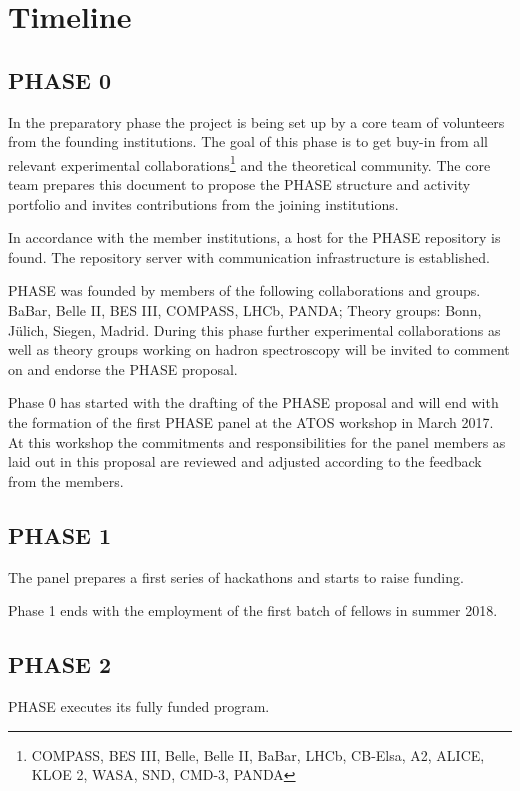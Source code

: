 \section{Timeline}

\subsection{PHASE 0}
In the preparatory phase the project is being set up by a core team of volunteers from the founding institutions. The goal of this phase is to get buy-in from all relevant
experimental collaborations\footnote{COMPASS, BES III, Belle, Belle II, BaBar, LHCb, CB-Elsa, A2, ALICE, KLOE 2, WASA, SND, CMD-3, PANDA} and the theoretical community.  The core team prepares this document to propose the PHASE structure and activity portfolio and invites contributions from the joining institutions.

In accordance with the member institutions, a host for the PHASE repository is found. The repository server with communication infrastructure is established.

PHASE was founded by members of the following collaborations and groups. BaBar, Belle II, BES III, COMPASS, LHCb, PANDA; Theory groups: Bonn, J\"ulich, Siegen, Madrid.
During this phase further experimental collaborations as well as theory groups working on hadron spectroscopy will be invited to comment on and endorse the PHASE proposal. 

Phase 0 has started with the drafting of the PHASE proposal and will end with the formation of the first PHASE panel at the ATOS workshop in March 2017. At this workshop the commitments and responsibilities for the panel members as laid out in this proposal are reviewed and adjusted according to the feedback from the members.

\subsection{PHASE 1}
The panel prepares a first series of hackathons and starts to raise funding.

Phase 1 ends with the employment of the first batch of fellows in summer 2018.
\subsection{PHASE 2}
PHASE executes its fully funded program.